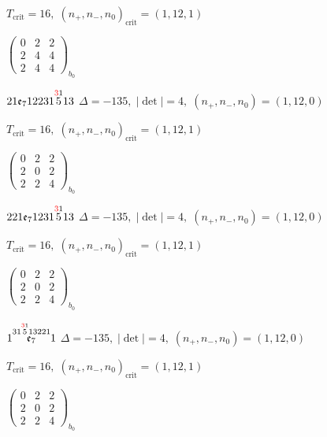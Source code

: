 \documentclass[10pt]{article}
\begin{document}
\hspace{1em}$T_{\text{crit}}=16,\; (n_+,n_-,n_0)_{\text{crit}}=(1,12,1)$

\hspace{2em}$\left(\begin{smallmatrix}0 & 2 & 2 \\ 2 & 4 & 4 \\ 2 & 4 & 4\end{smallmatrix}\right)_{\!b_0}$

\smallskip

$21\mathfrak{e}_712231\overset{\textcolor{red}{3}1}{5}13$ \quad $\Delta=-135,\; |\det|=4,\; (n_+,n_-,n_0)=(1,12,0)$

\hspace{1em}$T_{\text{crit}}=16,\; (n_+,n_-,n_0)_{\text{crit}}=(1,12,1)$

\hspace{2em}$\left(\begin{smallmatrix}0 & 2 & 2 \\ 2 & 0 & 2 \\ 2 & 2 & 4\end{smallmatrix}\right)_{\!b_0}$

\smallskip

$221\mathfrak{e}_71231\overset{\textcolor{red}{3}1}{5}13$ \quad $\Delta=-135,\; |\det|=4,\; (n_+,n_-,n_0)=(1,12,0)$

\hspace{1em}$T_{\text{crit}}=16,\; (n_+,n_-,n_0)_{\text{crit}}=(1,12,1)$

\hspace{2em}$\left(\begin{smallmatrix}0 & 2 & 2 \\ 2 & 0 & 2 \\ 2 & 2 & 4\end{smallmatrix}\right)_{\!b_0}$

\smallskip

$1\overset{31\overset{\textcolor{red}{3}1}{5}13221}{\mathfrak{e}_7}1$ \quad $\Delta=-135,\; |\det|=4,\; (n_+,n_-,n_0)=(1,12,0)$

\hspace{1em}$T_{\text{crit}}=16,\; (n_+,n_-,n_0)_{\text{crit}}=(1,12,1)$

\hspace{2em}$\left(\begin{smallmatrix}0 & 2 & 2 \\ 2 & 0 & 2 \\ 2 & 2 & 4\end{smallmatrix}\right)_{\!b_0}$
\end{document}
